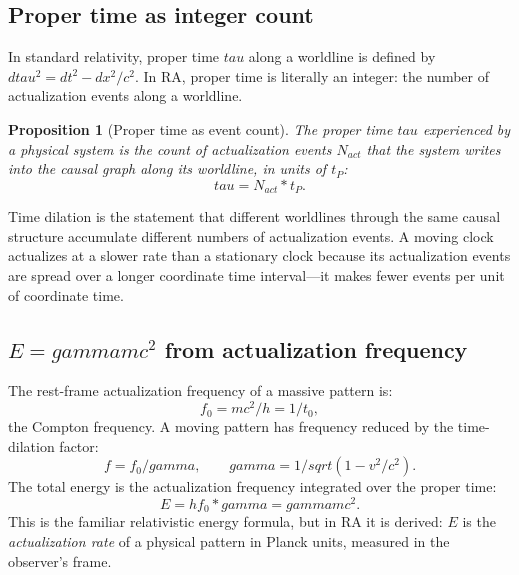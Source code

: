 \documentclass[11pt]{article}
\def\gamma{gamma}%
\def\tau{tau}%
\def\mathrm#1{#1}%
\def\sqrt#1{sqrt(#1)}%
\def\frac#1#2{#1/#2}%
\def\cdot{*}%
\newtheorem{proposition}{Proposition}
\begin{document}
\subsection{Proper time as integer count}

In standard relativity, proper time $\tau$ along a worldline is defined by $d\tau^2 = dt^2 - dx^2/c^2$. In RA, proper time is literally an integer: the number of actualization events along a worldline.

\begin{proposition}[Proper time as event count]
\label{prop:proper_time}
The proper time $\tau$ experienced by a physical system is the count of actualization events $N_{\mathrm{act}}$ that the system writes into the causal graph along its worldline, in units of $t_P$:
\begin{equation}
\tau = N_{\mathrm{act}} \cdot t_P.
\end{equation}
\end{proposition}

Time dilation is the statement that different worldlines through the same causal structure accumulate different numbers of actualization events. A moving clock actualizes at a slower rate than a stationary clock because its actualization events are spread over a longer coordinate time interval---it makes fewer events per unit of coordinate time.

\subsection{$E = \gamma m c^2$ from actualization frequency}

The rest-frame actualization frequency of a massive pattern is:
\begin{equation}
f_0 = \frac{mc^2}{h} = \frac{1}{t_0},
\end{equation}
the Compton frequency. A moving pattern has frequency reduced by the time-dilation factor:
\begin{equation}
f = f_0/\gamma, \qquad \gamma = 1/\sqrt{1 - v^2/c^2}.
\end{equation}
The total energy is the actualization frequency integrated over the proper time:
\begin{equation}
E = h f_0 \cdot \gamma = \gamma m c^2.
\end{equation}
This is the familiar relativistic energy formula, but in RA it is derived: $E$ is the \emph{actualization rate} of a physical pattern in Planck units, measured in the observer's frame.
\end{document}
